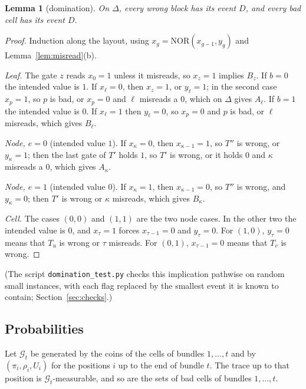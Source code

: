 \documentclass[11pt]{amsart}
\newtheorem{lemma}[theorem]{Lemma}
\theoremstyle{definition}
\theoremstyle{remark}
\newcommand{\NOR}{\mathrm{NOR}}
\begin{document}
\begin{lemma}[domination]\label{lem:dom}
On $\Delta$, every wrong block has its event $D$, and every bad cell has its event $D$.
\end{lemma}

\begin{proof}
Induction along the layout, using $x_g=\NOR(x_{g-1},y_g)$ and Lemma~\ref{lem:misread}(b).

\emph{Leaf.} The gate $z$ reads $x_0=1$ unless it misreads, so $x_z=1$ implies $B_z$. If $b=0$ the
intended value is $1$. If $x_\ell=0$, then $x_z=1$, or $y_\ell=1$; in the second case $x_p=1$, so
$p$ is bad, or $x_p=0$ and $\ell$ misreads a $0$, which on $\Delta$ gives $A_\ell$. If $b=1$ the
intended value is $0$. If $x_\ell=1$ then $y_\ell=0$, so $x_p=0$ and $p$ is bad, or $\ell$ misreads,
which gives $B_\ell$.

\emph{Node, $e=0$} (intended value $1$). If $x_\kappa=0$, then $x_{\kappa-1}=1$, so $T''$ is wrong,
or $y_\kappa=1$; then the last gate of $T'$ holds $1$, so $T'$ is wrong, or it holds $0$ and
$\kappa$ misreads a $0$, which gives $A_\kappa$.

\emph{Node, $e=1$} (intended value $0$). If $x_\kappa=1$, then $x_{\kappa-1}=0$, so $T''$ is wrong,
and $y_\kappa=0$; then $T'$ is wrong or $\kappa$ misreads, which gives $B_\kappa$.

\emph{Cell.} The cases $(0,0)$ and $(1,1)$ are the two node cases. In the other two the intended
value is $0$, and $x_\tau=1$ forces $x_{\tau-1}=0$ and $y_\tau=0$. For $(1,0)$, $y_\tau=0$ means
that $T_u$ is wrong or $\tau$ misreads. For $(0,1)$, $x_{\tau-1}=0$ means that $T_v$ is wrong.
\end{proof}

\noindent(The script \texttt{domination\_test.py} checks this implication pathwise on random small
instances, with each flag replaced by the smallest event it is known to contain;
Section~\ref{sec:checks}.)

\subsection{Probabilities}

Let $\mathcal G_t$ be generated by the coins of the cells of bundles $1,\dots,t$ and by
$(\pi_i,\rho_i,U_i)$ for the positions $i$ up to the end of bundle $t$. The trace up to that
position is $\mathcal G_t$-measurable, and so are the sets of bad cells of bundles $1,\dots,t$.
\end{document}
